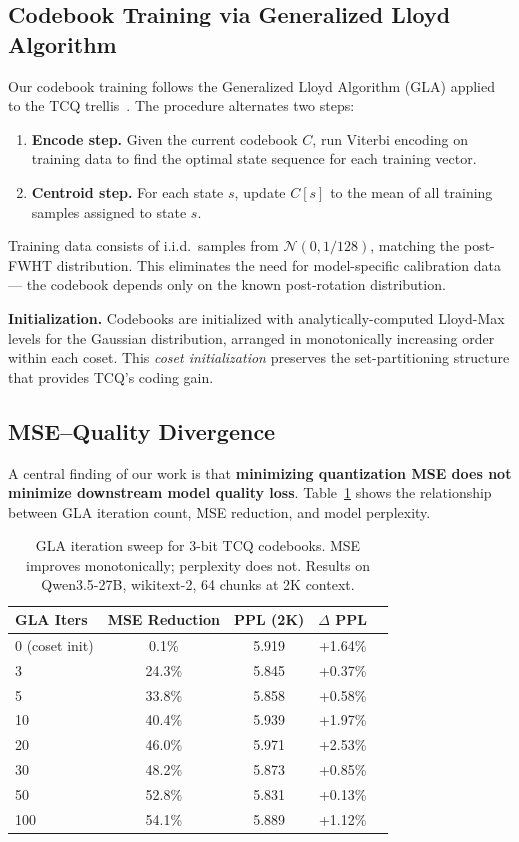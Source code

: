 \documentclass{article}
\begin{document}
\subsection{Codebook Training via Generalized Lloyd Algorithm}
\label{sec:gla}

Our codebook training follows the Generalized Lloyd Algorithm (GLA) applied to
the TCQ trellis~\cite{sabin1986gla}. The procedure alternates two steps:

\begin{enumerate}
\item \textbf{Encode step.} Given the current codebook $C$, run Viterbi
  encoding on training data to find the optimal state sequence for each training
  vector.
\item \textbf{Centroid step.} For each state $s$, update $C[s]$ to the mean of
  all training samples assigned to state $s$.
\end{enumerate}

Training data consists of i.i.d.\ samples from $\mathcal{N}(0, 1/128)$,
matching the post-FWHT distribution. This eliminates the need for model-specific
calibration data — the codebook depends only on the known post-rotation
distribution.

\textbf{Initialization.} Codebooks are initialized with analytically-computed
Lloyd-Max levels for the Gaussian distribution, arranged in monotonically
increasing order within each coset. This \emph{coset initialization} preserves
the set-partitioning structure that provides TCQ's coding gain.

\subsection{MSE--Quality Divergence}
\label{sec:mse_divergence}

A central finding of our work is that \textbf{minimizing quantization MSE does
not minimize downstream model quality loss}. Table~\ref{tab:mse_ppl} shows the
relationship between GLA iteration count, MSE reduction, and model perplexity.

\begin{table}[t]
\centering
\caption{GLA iteration sweep for 3-bit TCQ codebooks. MSE improves
monotonically; perplexity does not. Results on Qwen3.5-27B, wikitext-2,
64 chunks at 2K context.}
\label{tab:mse_ppl}
\begin{tabular}{@{}lcccc@{}}
\toprule
GLA Iters & MSE Reduction & PPL (2K) & $\Delta$ PPL \\
\midrule
0 (coset init) & 0.1\% & 5.919 & +1.64\% \\
3 & 24.3\% & 5.845 & +0.37\% \\
5 & 33.8\% & 5.858 & +0.58\% \\
10 & 40.4\% & 5.939 & +1.97\% \\
20 & 46.0\% & 5.971 & +2.53\% \\
30 & 48.2\% & 5.873 & +0.85\% \\
50 & 52.8\% & 5.831 & +0.13\% \\
100 & 54.1\% & 5.889 & +1.12\% \\
\bottomrule
\end{tabular}
\end{table}
\end{document}
